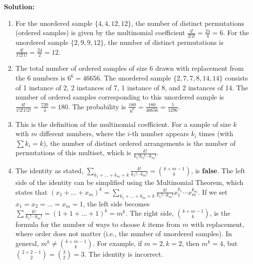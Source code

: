 \noindent\textbf{Solution:}
\begin{enumerate}[label=(\alph*)]
    \item For the unordered sample $\{4,4,12,12\}$, the number of distinct permutations (ordered samples) is given by the multinomial coefficient $\frac{4!}{2!2!} = \frac{24}{4} = 6$.
    \vspace{1ex} %
    For the unordered sample $\{2,9,9,12\}$, the number of distinct permutations is $\frac{4!}{1!2!1!} = \frac{24}{2} = 12$.
    \item The total number of ordered samples of size 6 drawn with replacement from the 6 numbers is $6^6 = 46656$. The unordered sample $\{2,7,7,8,14,14\}$ consists of 1 instance of 2, 2 instances of 7, 1 instance of 8, and 2 instances of 14. The number of ordered samples corresponding to this unordered sample is $\frac{6!}{1!2!1!2!} = \frac{720}{4} = 180$.
    \vspace{1ex} %
    The probability is $\frac{180}{6^6} = \frac{180}{46656} = \frac{5}{1296}$.
    \item This is the definition of the multinomial coefficient. For a sample of size $k$ with $m$ different numbers, where the $i$-th number appears $k_i$ times (with $\sum k_i=k$), the number of distinct ordered arrangements is the number of permutations of this multiset, which is $\frac{k!}{k_1!k_2!\cdots k_m!}$.
    \item The identity as stated, $\sum_{k_1+\dots+k_m=k}\frac{k!}{k_1!\cdots k_m!} = \binom{k+m-1}{k}$, is \textbf{false}.
    \vspace{1ex} %
    The left side of the identity can be simplified using the Multinomial Theorem, which states that $(x_1 + \dots + x_m)^k = \sum_{k_1+\dots+k_m=k}\frac{k!}{k_1!\cdots k_m!} x_1^{k_1}\cdots x_m^{k_m}$.
    \vspace{1ex} %
    If we set $x_1 = x_2 = \dots = x_m = 1$, the left side becomes $\sum \frac{k!}{k_1!\cdots k_m!} = (1+1+\dots+1)^k = m^k$.
    \vspace{1ex} %
    The right side, $\binom{k+m-1}{k}$, is the formula for the number of ways to choose $k$ items from $m$ with replacement, where order does not matter (i.e., the number of unordered samples).
    \vspace{1ex} %
    In general, $m^k \neq \binom{k+m-1}{k}$. For example, if $m=2, k=2$, then $m^k = 4$, but $\binom{2+2-1}{2} = \binom{3}{2} = 3$. The identity is incorrect.
\end{enumerate}



